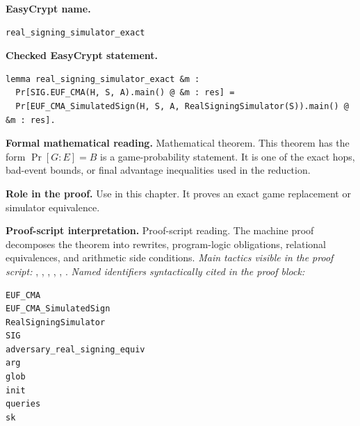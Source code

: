 \begin{formaltheorem}
\noindent\textbf{EasyCrypt name.}
\begin{lstlisting}[language=EasyCrypt,basicstyle=\ttfamily\scriptsize]
real_signing_simulator_exact
\end{lstlisting}
\noindent\textbf{Checked EasyCrypt statement.}
\begin{lstlisting}[language=EasyCrypt,basicstyle=\ttfamily\scriptsize]
lemma real_signing_simulator_exact &m :
  Pr[SIG.EUF_CMA(H, S, A).main() @ &m : res] =
  Pr[EUF_CMA_SimulatedSign(H, S, A, RealSigningSimulator(S)).main() @ &m : res].
\end{lstlisting}
\noindent\textbf{Formal mathematical reading.}
Mathematical theorem. This theorem has the form \(\Pr[G:E] = B\) is a game-probability statement.  It is one of the exact hops, bad-event bounds, or final advantage inequalities used in the reduction.

\noindent\textbf{Role in the proof.}
Use in this chapter. It proves an exact game replacement or simulator equivalence.

\noindent\textbf{Proof-script interpretation.}
Proof-script reading. The machine proof decomposes the theorem into rewrites, program-logic obligations, relational equivalences, and arithmetic side conditions.
\emph{Main tactics visible in the proof script:} , , , , , .
\emph{Named identifiers syntactically cited in the proof block:}
\begin{lstlisting}[language=EasyCrypt,basicstyle=\ttfamily\scriptsize]
EUF_CMA
EUF_CMA_SimulatedSign
RealSigningSimulator
SIG
adversary_real_signing_equiv
arg
glob
init
queries
sk
\end{lstlisting}

\end{formaltheorem}

